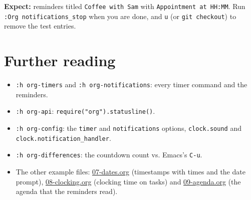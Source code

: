 \textbf{Expect:} reminders titled \texttt{Coffee with Sam} with \texttt{Appointment at HH:MM}.
Run \texttt{:Org notifications\_stop} when you are done, and \texttt{u} (or \texttt{git
checkout}) to remove the test entries.
\section{Further reading}
\label{sec:orga5fd821}
\begin{itemize}
\item \texttt{:h org-timers} and \texttt{:h org-notifications}: every timer command and the
reminders.
\item \texttt{:h org-api}: \texttt{require("org").statusline()}.
\item \texttt{:h org-config}: the \texttt{timer} and \texttt{notifications} options, \texttt{clock.sound}
and \texttt{clock.notification\_handler}.
\item \texttt{:h org-differences}: the countdown count vs. Emacs's \texttt{C-u}.
\item The other example files: \href{07-dates.org}{07-dates.org} (timestamps
with times and the date prompt), \href{08-clocking.org}{08-clocking.org}
(clocking time on tasks) and \href{09-agenda.org}{09-agenda.org} (the
agenda that the reminders read).
\end{itemize}
